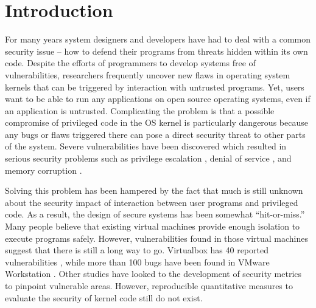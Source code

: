 \section{Introduction}
\label{sec.introduction}

For many years system designers and developers have had to deal with a common security issue -- 
how to defend their programs from threats hidden within its own code. Despite the efforts of programmers 
to develop systems free of vulnerabilities, researchers frequently uncover new flaws in operating system kernels that 
can be triggered by interaction with untrusted programs. Yet, users want to be able to run any applications 
on open source operating systems, even if an application is untrusted. Complicating the problem is that 
a possible compromise of privileged code in the OS kernel is particularly dangerous because any bugs or flaws triggered there 
can pose a direct security threat to other parts of the system. Severe vulnerabilities have been discovered 
which resulted in serious security problems such as privilege escalation \cite{CVE-2016-0728, CVE-2015-8660}, 
denial of service \cite{CVE-2015-8539, CVE-2015-5364}, and memory corruption \cite{CVE-2014-9529}.

Solving this problem has been hampered by the fact that much is still unknown about the security impact of 
interaction between user programs and privileged code. As a result, the design of secure systems has been 
somewhat ``hit-or-miss.'' Many people believe that existing virtual machines provide enough isolation to 
execute programs safely. However, vulnerabilities found in those virtual machines suggest that there is still a long way to go. 
Virtualbox has 40 reported vulnerabilities \cite{Virtualbox-Vulnerabilities}, 
while more than 100 bugs have been found in VMware Workstation \cite{VMWare-Vulnerabilities}. 
Other studies have looked to the development of security metrics \cite{PittSFIeld, ozment2006milk} to pinpoint vulnerable areas. 
However, reproducible quantitative measures to evaluate the security of kernel code still do not exist. 

